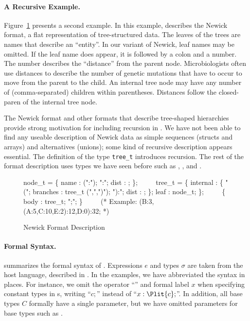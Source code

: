 \paragraph*{A Recursive \ipads{} Example.}
Figure~\ref{fig:ipads-newick} presents a second \ipads{} example.
In this example, \ipads{} describes the Newick format, a flat
representation of tree-structured data.  The leaves of the trees
are names that describe an ``entity''.   In our variant of Newick, 
leaf names may be omitted.  If the leaf name does appear,
it is followed by a colon and a number.  The number describes the ``distance''
from the parent node.  Microbiologists often use
distances to describe the
number of genetic mutations that have to occur to move from the parent 
to the child.  An internal tree node may have any number of (comma-separated)
children within parentheses.  Distances follow the closed-paren
of the internal tree node.

The Newick format and other formats that describe tree-shaped 
hierarchies~\cite{geneontology,newick}
provide strong motivation for including recursion in \ipads.  
We have not been able to find any useable description of Newick data as
simple sequences (structs and arrays) and alternatives (unions); some
kind of recursive description appears essential.
The definition of the type {\tt tree\_t} introduces recursion.
The rest of the format description uses types we have seen before such as
\Pstruct, \Parray{}, and \Punion.


\begin{figure}
{\small
\begin{code}
node\_t = \Popt \Pstruct \{
                name : \Pstring(":"); ":";
                dist : \Puint;  
              \};
\(\qquad\)
\Prec tree\_t = \Punion \{
    internal : \Pstruct \{
        "(";  branches : tree\_t \Parray(",",")");
        "):"; dist : \Puint;
      \};
    leaf : node\_t;
  \};
\(\qquad\)
\Pstruct \{ body : tree\_t; ";"; \}
\(\qquad\)
(* Example: (B:3,(A:5,C:10,E:2):12,D:0):32; *)
\end{code}
\caption{\ipads{} Newick Format Description}
\label{fig:ipads-newick}
}
\end{figure}

\paragraph*{Formal Syntax.}
 summarizes the formal syntax of \ipads.
Expressions $e$ and types $\sigma$ are taken from the host language,  
described in . 
In the examples, we have abbreviated the syntax in places.  
For instance, we omit the operator ``'' and formal label 
$x$ when specifying constant types in \Pstruct{}s, writing
``$c;$'' instead of ``$x :
\Plit{c};$''. In addition, all
base types $C$ formally have a single parameter, but we have omitted
parameters for base types such as \Puint.  

